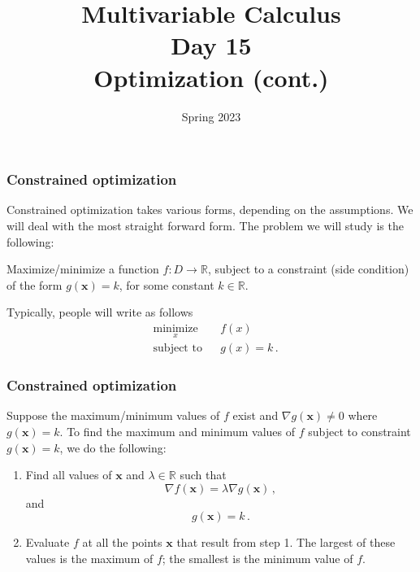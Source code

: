 \documentclass[aspectratio=169]{beamer}
\title{ Multivariable Calculus \\ Day  15\\ Optimization (cont.) }
\date{Spring 2023}
\begin{document}
\maketitle

\begin{frame}
    \frametitle{Constrained optimization}
Constrained optimization takes various forms, depending on the assumptions.
We will deal with the most straight forward form.
The problem we will study is the following:

Maximize/minimize a function \(f:D\to \mathbb{R}\), subject to a constraint (side condition)
of the form
\(g(\mathbf{x}) = k\), for some constant \(k\in \mathbb{R}\).


Typically, people will write as follows
\begin{equation*}
\begin{aligned}
& \underset{x}{\text{minimize}}
& & f(x) \\
& \text{subject to}
& & 
g(x) = k \,.
\end{aligned}
\end{equation*}
\end{frame}

\begin{frame}
    \frametitle{Constrained optimization}
    
\begin{theorem}

Suppose the maximum/minimum values of \(f\) exist and \(\nabla g(\mathbf{x}) \not=0\) where \(g(\mathbf{x}) = k\).
To find the maximum and minimum values of \(f\) subject to constraint
\(g(\mathbf{x}) = k\), we do the following:

\begin{enumerate}
\def\labelenumi{\arabic{enumi}.}
\item
  Find all values of \(\mathbf{x}\) and \(\lambda \in \mathbb{R}\) such that
  \begin{equation*}
   \nabla f(\mathbf{x}) =\lambda \nabla g(\mathbf{x})\,,
  \end{equation*}
  and
  \begin{equation*}
   g(\mathbf{x}) = k \,.
  \end{equation*}
\item
  Evaluate \(f\) at all the points \(\mathbf{x}\) that result from step 1. The largest of
  these values is the maximum of \(f\); the smallest is the minimum value of \(f\).
\end{enumerate}

\end{theorem}
\end{frame}
\end{document}
